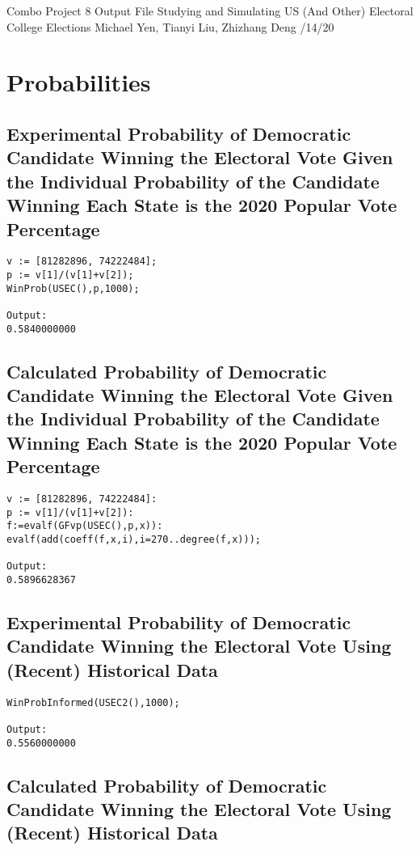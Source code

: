 \documentclass[12pt]{article}
\begin{document}
\noindent
Combo Project 8 Output File \newline
Studying and Simulating US (And Other) Electoral College Elections \newline
Michael Yen, Tianyi Liu, Zhizhang Deng /14/20

\section{Probabilities}
\subsection{Experimental Probability of Democratic Candidate Winning the Electoral Vote Given the Individual Probability of the Candidate Winning Each State is the 2020 Popular Vote Percentage}

\begin{verbatim}
v := [81282896, 74222484];
p := v[1]/(v[1]+v[2]);
WinProb(USEC(),p,1000);

Output:
0.5840000000
\end{verbatim}

\subsection{Calculated Probability of Democratic Candidate Winning the Electoral Vote Given the Individual Probability of the Candidate Winning Each State is the 2020 Popular Vote Percentage}

\begin{verbatim}
v := [81282896, 74222484]:
p := v[1]/(v[1]+v[2]):
f:=evalf(GFvp(USEC(),p,x)):
evalf(add(coeff(f,x,i),i=270..degree(f,x)));

Output:
0.5896628367
\end{verbatim}

\subsection{Experimental Probability of Democratic Candidate Winning the Electoral Vote Using (Recent) Historical Data}

\begin{verbatim}
WinProbInformed(USEC2(),1000);

Output:
0.5560000000
\end{verbatim}

\subsection{Calculated Probability of Democratic Candidate Winning the Electoral Vote Using (Recent) Historical Data}
\end{document}

